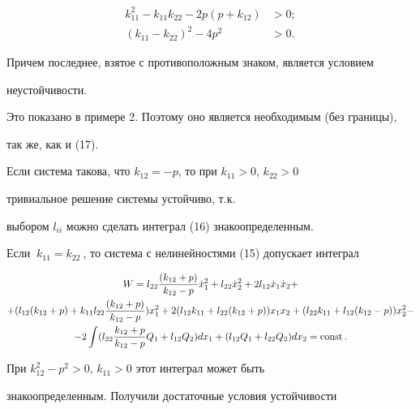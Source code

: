 \begin{align*}


k_{11}^{2}-k_{11}k_{22}-2p(p+k_{12})&>0;\\


%


(k_{11}-k_{22})^{2}-4p^{2}&>0.


\end{align*}


Причем последнее, взятое с противоположным знаком, является условием


неустойчивости.


Это показано в примере 2. Поэтому оно является необходимым (без границы),


так же, как и (17).





Если система такова, что $k_{12}=-p$, то при $k_{11}>0$, $k_{22}>0$


тривиальное решение системы устойчиво, т.к.


выбором $l_{ii}$ можно сделать интеграл (16) знакоопределенным.





Если $\ k_{11}=k_{22}\ $, то система с нелинейностями (15) допускает интеграл


\begin{multline*}


W=l_{22}\frac{(k_{12}+p)}{k_{12}-p}\Dot x_{1}^{2}+


l_{22}\Dot x_{2}^{2}+2l_{12}\Dot x_{1}\Dot x_{2}+\\


%


+(l_{12}(k_{12}+p)+k_{11}l_{22}\frac{(k_{12}+p)}{k_{12}-p}) x_{1}^{2} +


2(l_{12}k_{11} +l_{22}(k_{12}+p))x_{1}x_{2}+


(l_{22}k_{11} +l_{12}(k_{12}-p))x_{2}^{2}-\\


%


-2\int (l_{22}\frac{k_{12}+p}{k_{12}-p}Q_{1}+l_{12}Q_{2})dx_{1}+


(l_{12}Q_{1}+l_{22}Q_{2})dx_{2}=\const.


\end{multline*}


При $k_{12}^{2}-p^{2}>0$, $k_{11}>0$ этот интеграл может быть


знакоопределенным. Получили достаточные условия устойчивости


